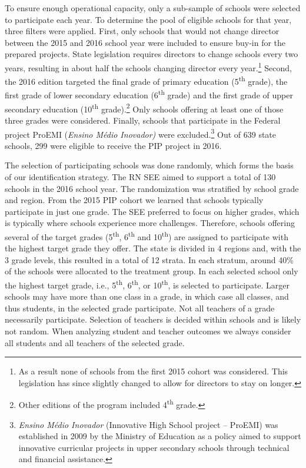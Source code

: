 \documentclass[11pt,a4paper]{article}
\begin{document}
To ensure enough operational capacity, only a sub-sample of schools were selected to participate each year. To determine the pool of eligible schools for that year, three filters were applied. First, only schools that would not change director between the 2015 and 2016 school year were included to ensure buy-in for the prepared projects. State legislation requires directors to change schools every two years, resulting in about half the schools changing director every year.\footnote{As a result none of schools from the first 2015 cohort was considered. This legislation has since slightly changed to allow for directors to stay on longer.} Second, the 2016 edition targeted the final grade of primary education (5\textsuperscript{th} grade), the first grade of lower secondary education (6\textsuperscript{th} grade) and the first grade of upper secondary education (10\textsuperscript{th} grade).\footnote{Other editions of the program included 4\textsuperscript{th} grade.} Only schools offering at least one of those three grades were considered. Finally, schools that participate in the Federal project ProEMI (\textit{Ensino Médio Inovador)} were excluded.\footnote{\textit{Ensino Médio Inovador} (Innovative High School project -- ProEMI) was established in 2009 by the Ministry of Education as a policy aimed to support innovative curricular projects in upper secondary schools through technical and financial assistance.} Out of 639 state schools, 299 were eligible to receive the PIP project in 2016. 

The selection of participating schools was done randomly, which forms the basis of our identification strategy. The RN SEE aimed to support a total of 130 schools in the 2016 school year. The randomization was stratified by school grade and region. From the 2015 PIP cohort we learned that schools typically participate in just one grade. The SEE preferred to focus on higher grades, which is typically where schools experience more challenges. Therefore, schools offering several of the target grades (5\textsuperscript{th}, 6\textsuperscript{th} and 10\textsuperscript{th}) are assigned to participate with the highest target grade they offer. The state is divided in 4 regions and, with the 3 grade levels, this resulted in a total of 12 strata. In each stratum, around 40\% of the schools were allocated to the treatment group. In each selected school only the highest target grade, i.e., 5\textsuperscript{th}, 6\textsuperscript{th}, or 10\textsuperscript{th}, is selected to participate. Larger schools may have more than one class in a grade, in which case all classes, and thus students, in the selected grade participate. Not all teachers of a grade necessarily participate. Selection of teachers is decided within schools and is likely not random. When analyzing student and teacher outcomes we always consider all students and all teachers of the selected grade. 
\end{document}
